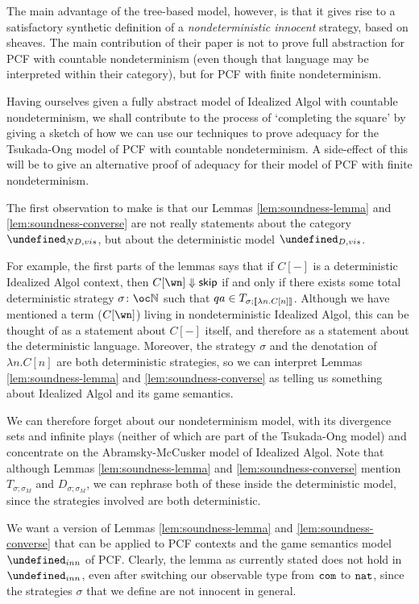 \documentclass[sigplan,9pt,review]{acmart}\settopmatter{printfolios=true,printccs=false,printacmref=false}
\let\G\undefined
\begin{document}
The main advantage of the tree-based model, however, is that it gives rise to a satisfactory synthetic definition of a \emph{nondeterministic innocent} strategy, based on sheaves.  
The main contribution of their paper is not to prove full abstraction for PCF with countable nondeterminism (even though that language may be interpreted within their category), but for PCF with finite nondeterminism.  

Having ourselves given a fully abstract model of Idealized Algol with countable nondeterminism, we shall contribute to the process of `completing the square' by giving a sketch of how we can use our techniques to prove adequacy for the Tsukada-Ong model of PCF with countable nondeterminism.  
A side-effect of this will be to give an alternative proof of adequacy for their model of PCF with finite nondeterminism.  

The first observation to make is that our Lemmas \ref{lem:soundness-lemma} and \ref{lem:soundness-converse} are not really statements about the category $\G_{ND,vis}$, but about the deterministic model $\G_{D,vis}$.  

For example, the first parts of the lemmas says that if $C[-]$ is a deterministic Idealized Algol context, then $C[\wn]\converges\skipp$ if and only if there exists some total deterministic strategy $\sigma\from\oc\bN$ such that $qa\in T_{\sigma;\left\llbracket\lambda n.C[n]\right\rrbracket}$.  
Although we have mentioned a term ($C[\wn]$) living in nondeterministic Idealized Algol, this can be thought of as a statement about $C[-]$ itself, and therefore as a statement about the deterministic language.
Moreover, the strategy $\sigma$ and the denotation of $\lambda n.C[n]$ are both deterministic strategies, so we can interpret Lemmas \ref{lem:soundness-lemma} and \ref{lem:soundness-converse} as telling us something about Idealized Algol and its game semantics.  

We can therefore forget about our nondeterminism model, with its divergence sets and infinite plays (neither of which are part of the Tsukada-Ong model) and concentrate on the Abramsky-McCusker model of Idealized Algol.
Note that although Lemmas \ref{lem:soundness-lemma} and \ref{lem:soundness-converse} mention $T_{\sigma;\sigma_M}$ and $D_{\sigma;\sigma_M}$, we can rephrase both of these inside the deterministic model, since the strategies involved are both deterministic.  

We want a version of Lemmas \ref{lem:soundness-lemma} and \ref{lem:soundness-converse} that can be applied to PCF contexts and the game semantics model $\G_{inn}$ of PCF.  
Clearly, the lemma as currently stated does not hold in $\G_{inn}$, even after switching our observable type from ${\mathtt{com}}$ to ${\mathtt{nat}}$, since the strategies $\sigma$ that we define are not innocent in general.  
\end{document}
